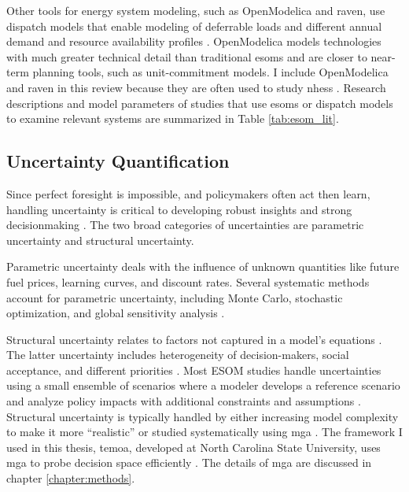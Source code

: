 Other tools for energy system modeling, such as OpenModelica and \gls{raven},
use dispatch models that enable modeling of deferrable loads and different annual
demand and resource availability profiles \cite{baker_optimal_2018,epiney_economic_2020}.
OpenModelica models technologies with much greater technical detail than traditional
\glspl{esom} and are closer to near-term planning tools, such as unit-commitment
models. I include OpenModelica and
\gls{raven} in this review because they are often used to study \glspl{nhes}
\cite{baker_optimal_2018,garcia_dynamic_2016,epiney_economic_2020}.
Research descriptions and model parameters of studies that use \glspl{esom} or
dispatch models to examine relevant systems are summarized in Table \ref{tab:esom_lit}.

\subsection{Uncertainty Quantification}

Since perfect foresight is impossible, and policymakers often act then learn, handling
uncertainty is critical to developing robust insights and strong decisionmaking
\cite{yue_review_2018, decarolis_modelling_2016}.
The two broad categories of uncertainties are parametric uncertainty and structural
uncertainty.

Parametric uncertainty deals with the influence of unknown quantities
like future fuel prices, learning curves, and discount rates. Several systematic methods account for parametric uncertainty, including Monte Carlo, stochastic optimization, and
global sensitivity analysis \cite{yue_review_2018}.

Structural uncertainty relates to factors not captured in a model’s equations
\cite{hunter_modeling_2013, yue_review_2018}. The latter uncertainty includes
heterogeneity of decision-makers,
social acceptance, and different priorities \cite{yue_review_2018}. Most ESOM
studies handle uncertainties using a small ensemble of scenarios where a modeler
develops a  reference scenario and analyze policy impacts with additional constraints
and assumptions \cite{yue_review_2018}.
Structural uncertainty is typically handled by either increasing model complexity
to make it more ``realistic'' or studied systematically using \gls{mga}
\cite{hunter_modeling_2013,decarolis_modelling_2016, yue_review_2018}.
The framework I used in this thesis, \gls{temoa}, developed at North Carolina
State University, uses \gls{mga} to probe decision space efficiently
\cite{decarolis_temoa_2010}. The details of \gls{mga} are discussed in chapter
\ref{chapter:methods}.



